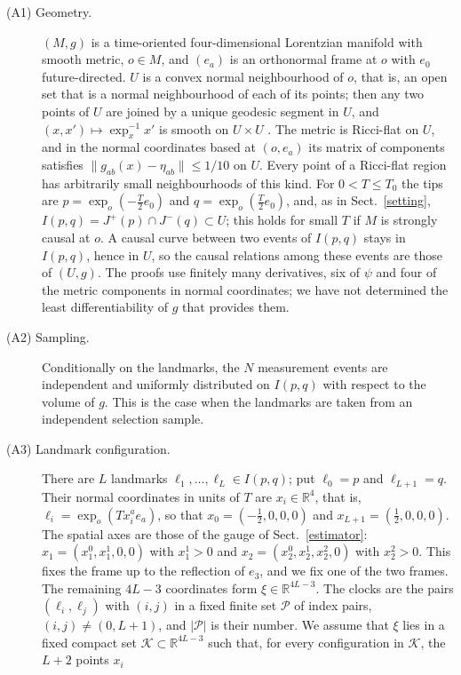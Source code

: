 \begin{description}
\item[(A1) Geometry.] $(M,g)$ is a time-oriented four-dimensional Lorentzian
manifold with smooth metric, $o\in M$, and $(e_a)$ is an orthonormal frame
at $o$ with $e_0$ future-directed. $U$ is a convex normal neighbourhood of
$o$, that is, an open set that is a normal neighbourhood of each of its
points; then any two points of $U$ are joined by a unique geodesic segment
in $U$, and $(x,x')\mapsto\exp_x^{-1}x'$ is smooth on $U\times U$
\cite[Chap.~5]{oneill}. The metric is Ricci-flat on $U$, and in the normal
coordinates based at $(o,e_a)$ its matrix of components satisfies
$\|g_{ab}(x)-\eta_{ab}\|\le1/10$ on $U$. Every point of a Ricci-flat region
has arbitrarily small neighbourhoods of this kind. For $0<T\le T_0$ the tips
are $p=\exp_o(-\tfrac T2e_0)$ and $q=\exp_o(\tfrac T2e_0)$, and, as in
Sect.~\ref{setting}, $I(p,q)=J^+(p)\cap J^-(q)\subset U$; this holds for
small $T$ if $M$ is strongly causal at $o$. A causal curve between two
events of $I(p,q)$ stays in $I(p,q)$, hence in $U$, so the causal relations
among these events are those of $(U,g)$. The proofs use finitely many
derivatives, six of $\psi$ and four of the metric components in normal
coordinates; we have not determined the least differentiability of $g$ that
provides them.
\item[(A2) Sampling.] Conditionally on the landmarks, the $N$ measurement
events are independent and uniformly distributed on $I(p,q)$ with respect to
the volume of $g$. This is the case when the landmarks are taken from an
independent selection sample.
\item[(A3) Landmark configuration.] There are $L$ landmarks
$\ell_1,\dots,\ell_L\in I(p,q)$; put $\ell_0=p$ and $\ell_{L+1}=q$. Their
normal coordinates in units of $T$ are $x_i\in\mathbb R^4$, that is,
$\ell_i=\exp_o(Tx_i^ae_a)$, so that $x_0=(-\tfrac12,0,0,0)$ and
$x_{L+1}=(\tfrac12,0,0,0)$. The spatial axes are those of the gauge of
Sect.~\ref{estimator}: $x_1=(x_1^0,x_1^1,0,0)$ with $x_1^1>0$ and
$x_2=(x_2^0,x_2^1,x_2^2,0)$ with $x_2^2>0$. This fixes the frame up to the
reflection of $e_3$, and we fix one of the two frames. The remaining $4L-3$
coordinates form $\xi\in\mathbb R^{4L-3}$. The clocks are the pairs
$(\ell_i,\ell_j)$ with $(i,j)$ in a fixed finite set $\mathcal P$ of index
pairs, $(i,j)\neq(0,L+1)$, and $|\mathcal P|$ is their number. We assume
that $\xi$ lies in a fixed compact set $\mathcal K\subset\mathbb R^{4L-3}$
such that, for every configuration in $\mathcal K$, the $L+2$ points $x_i$

\end{description}
